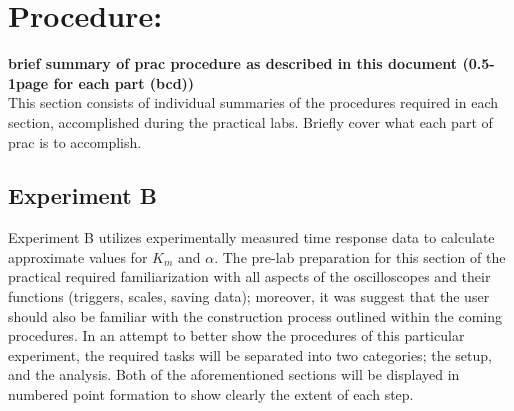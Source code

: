 \documentclass[11pt,a4paper]{article}
\begin{document}
\section{Procedure:}
\textbf{brief summary of prac procedure as described in this document (0.5-1page for each part (bcd))}\\
This section consists of individual summaries of the procedures required in each section, accomplished during the practical labs.
Briefly cover what each part of prac is to accomplish.


\pagebreak
\subsection{Experiment B}
Experiment B utilizes experimentally measured time response data to calculate approximate values for $K_m$ and $\alpha$. The pre-lab preparation for this section of the practical required familiarization with all aspects of the oscilloscopes and their functions (triggers, scales, saving data); moreover, it was suggest that the user should also be familiar with the construction process outlined within the coming procedures.
In an attempt to better show the procedures of this particular experiment, the required tasks will be separated into two categories; the setup, and the analysis. Both of the aforementioned sections will be displayed in numbered point formation to show clearly the extent of each step.\\
\end{document}
